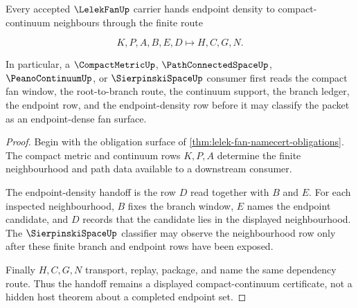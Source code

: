 \begin{theorem}
\label{thm:lelek-fan-endpoint-density-handoff}
Every accepted $\LelekFanUp$ carrier hands endpoint density to compact-continuum neighbours through the finite route

$$
K,P,A,B,E,D \longmapsto H,C,G,N.
$$

In particular, a $\CompactMetricUp$, $\PathConnectedSpaceUp$, $\PeanoContinuumUp$, or $\SierpinskiSpaceUp$ consumer first reads the compact fan window, the root-to-branch route, the continuum support, the branch ledger, the endpoint row, and the endpoint-density row before it may classify the packet as an endpoint-dense fan surface.
\end{theorem}
\begin{proof}
Begin with the obligation surface of \autoref{thm:lelek-fan-namecert-obligations}. The compact metric and continuum rows $K,P,A$ determine the finite neighbourhood and path data available to a downstream consumer.

The endpoint-density handoff is the row $D$ read together with $B$ and $E$. For each inspected neighbourhood, $B$ fixes the branch window, $E$ names the endpoint candidate, and $D$ records that the candidate lies in the displayed neighbourhood. The $\SierpinskiSpaceUp$ classifier may observe the neighbourhood row only after these finite branch and endpoint rows have been exposed.

Finally $H,C,G,N$ transport, replay, package, and name the same dependency route. Thus the handoff remains a displayed compact-continuum certificate, not a hidden host theorem about a completed endpoint set.
\end{proof}




